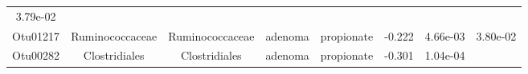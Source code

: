 \documentclass[11pt,]{article}
\begin{document}
\begin{longtable}[]{@{}cccccccc@{}}
\begin{minipage}[t]{0.08\columnwidth}
3.79e-02\strut
\end{minipage}\tabularnewline
\begin{minipage}[t]{0.08\columnwidth}\centering\strut
Otu01217\strut
\end{minipage} & \begin{minipage}[t]{0.15\columnwidth}\centering\strut
Ruminococcaceae\strut
\end{minipage} & \begin{minipage}[t]{0.15\columnwidth}\centering\strut
Ruminococcaceae\strut
\end{minipage} & \begin{minipage}[t]{0.08\columnwidth}\centering\strut
adenoma\strut
\end{minipage} & \begin{minipage}[t]{0.09\columnwidth}\centering\strut
propionate\strut
\end{minipage} & \begin{minipage}[t]{0.07\columnwidth}\centering\strut
-0.222\strut
\end{minipage} & \begin{minipage}[t]{0.08\columnwidth}\centering\strut
4.66e-03\strut
\end{minipage} & \begin{minipage}[t]{0.08\columnwidth}\centering\strut
3.80e-02\strut
\end{minipage}\tabularnewline
\begin{minipage}[t]{0.08\columnwidth}\centering\strut
Otu00282\strut
\end{minipage} & \begin{minipage}[t]{0.15\columnwidth}\centering\strut
Clostridiales\strut
\end{minipage} & \begin{minipage}[t]{0.15\columnwidth}\centering\strut
Clostridiales\strut
\end{minipage} & \begin{minipage}[t]{0.08\columnwidth}\centering\strut
adenoma\strut
\end{minipage} & \begin{minipage}[t]{0.09\columnwidth}\centering\strut
propionate\strut
\end{minipage} & \begin{minipage}[t]{0.07\columnwidth}\centering\strut
-0.301\strut
\end{minipage} & \begin{minipage}[t]{0.08\columnwidth}\centering\strut
1.04e-04\strut
\end{minipage} & \begin{minipage}[t]{0.08\columnwidth}\centering\strut

\end{minipage}
\end{longtable}
\end{document}
